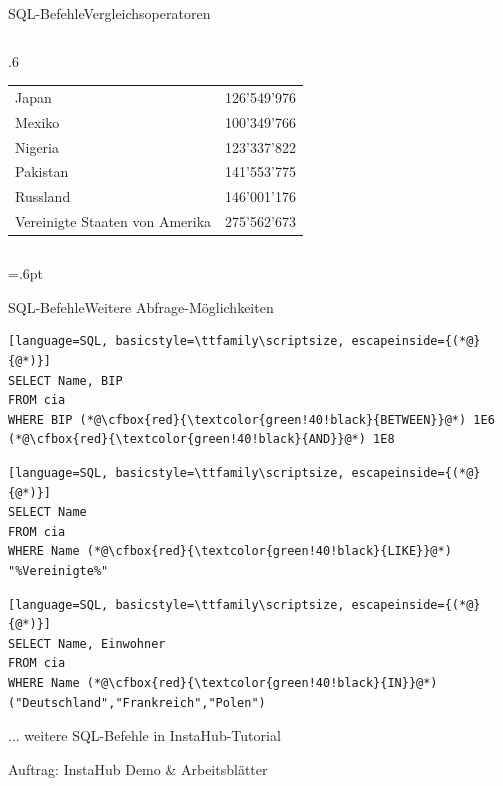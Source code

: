 \begin{frame}[fragile]{SQL-Befehle}{Vergleichsoperatoren}
\begin{columns}[c]
\begin{column}{.6\textwidth}
\begin{table}
\begin{tabular}{lr}
          Japan                          & 126'549'976        \\
          Mexiko                         & 100'349'766        \\
          Nigeria                        & 123'337'822        \\
          Pakistan                       & 141'553'775        \\
          Russland                       & 146'001'176        \\
          Vereinigte Staaten von Amerika & 275'562'673        \\
          \bottomrule
        \end{tabular}
      \end{table}

    \end{column}
  \end{columns}
\end{frame}

\fboxsep=.6pt
\newcommand{\cfbox}[2]{%
  \colorlet{currentcolor}{.}%
  {\color{#1}%
    \fbox{\color{currentcolor}#2}}%
}
\begin{frame}[fragile]{SQL-Befehle}{Weitere Abfrage-Möglichkeiten}
  \begin{lstlisting}[language=SQL, basicstyle=\ttfamily\scriptsize, escapeinside={(*@}{@*)}]
SELECT Name, BIP
FROM cia
WHERE BIP (*@\cfbox{red}{\textcolor{green!40!black}{BETWEEN}}@*) 1E6 (*@\cfbox{red}{\textcolor{green!40!black}{AND}}@*) 1E8
\end{lstlisting}
  \begin{lstlisting}[language=SQL, basicstyle=\ttfamily\scriptsize, escapeinside={(*@}{@*)}]
SELECT Name
FROM cia
WHERE Name (*@\cfbox{red}{\textcolor{green!40!black}{LIKE}}@*) "%Vereinigte%"
\end{lstlisting}

  \begin{lstlisting}[language=SQL, basicstyle=\ttfamily\scriptsize, escapeinside={(*@}{@*)}]
SELECT Name, Einwohner
FROM cia
WHERE Name (*@\cfbox{red}{\textcolor{green!40!black}{IN}}@*) ("Deutschland","Frankreich","Polen")
\end{lstlisting}
  ... weitere SQL-Befehle in InstaHub-Tutorial
\end{frame}

\begin{frame}{Auftrag: InstaHub }
  \centering
  Demo \& Arbeitsblätter
\end{frame}